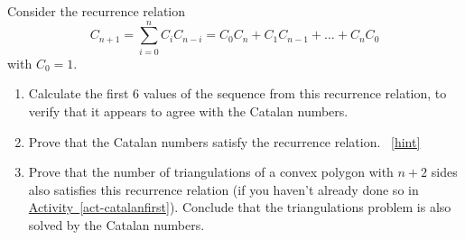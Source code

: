 \documentclass{book}
\begin{document}
\setcounter{project}{181}
\addtocounter{project}{-1}
\begin{activity}[]\label{activity-174}
\hypertarget{p-1061}{}%
Consider the recurrence relation%
\begin{equation*}
C_{n + 1} = \sum_{i = 0}^n C_iC_{n-i} = C_{0}C_{n} + C_{1}C_{n - 1} + \ldots + C_{n}C_{0}
\end{equation*}
with \(C_0 = 1\).%
\begin{enumerate}[font=\bfseries,label=(\alph*),ref=\alph*]
\item\label{task-192} \hypertarget{p-1062}{}%
Calculate the first 6 values of the sequence from this recurrence relation, to verify that it appears to agree with the Catalan numbers.%
\item\label{task-193} \hypertarget{p-1063}{}%
Prove that the Catalan numbers satisfy the recurrence relation.%
~\hfill{\tiny\hyperlink{a-181.b}{[hint]}\hypertarget{q-181.b}{}}\item\label{task-194} \hypertarget{p-1065}{}%
Prove that the number of triangulations of a convex polygon with \(n+2\) sides also satisfies this recurrence relation (if you haven't already done so in \hyperref[act-catalanfirst]{Activity~\ref{act-catalanfirst}}).  Conclude that the triangulations problem is also solved by the Catalan numbers.%
\end{enumerate}
\end{activity}
\end{document}
